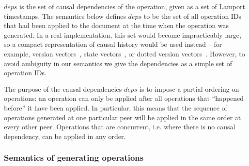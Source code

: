 \documentclass[10pt,journal,compsoc]{IEEEtran}
\begin{document}
$\mathit{deps}$ is the set of causal dependencies of the operation, given as a set of Lamport timestamps. The semantics below defines $\mathit{deps}$ to be the set of all operation IDs that had been applied to the document at the time when the operation was generated. In a real implementation, this set would become impracticably large, so a compact representation of causal history would be used instead -- for example, version vectors~\cite{ParkerJr:1983jb}, state vectors~\cite{Ellis:1989ue}, or dotted version vectors~\cite{Preguica:2012fx}. However, to avoid ambiguity in our semantics we give the dependencies as a simple set of operation IDs.

The purpose of the causal dependencies $\mathit{deps}$ is to impose a partial ordering on operations: an operation can only be applied after all operations that ``happened before'' it have been applied. In particular, this means that the sequence of operations generated at one particular peer will be applied in the same order at every other peer. Operations that are concurrent, i.e. where there is no causal dependency, can be applied in any order.

\subsubsection{Semantics of generating operations}
\end{document}
